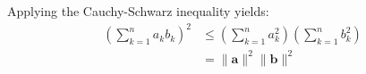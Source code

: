 \documentclass{article}
\begin{document}
Applying the Cauchy-Schwarz inequality yields:
\begin{align*}
\left( \sum_{k=1}^n a_k b_k \right)^2 &\leq \left( \sum_{k=1}^n a_k^2 \right) \left( \sum_{k=1}^n b_k^2 \right) \\
&= \| \mathbf{a} \|^2 \| \mathbf{b} \|^2
\end{align*}
\end{document}
